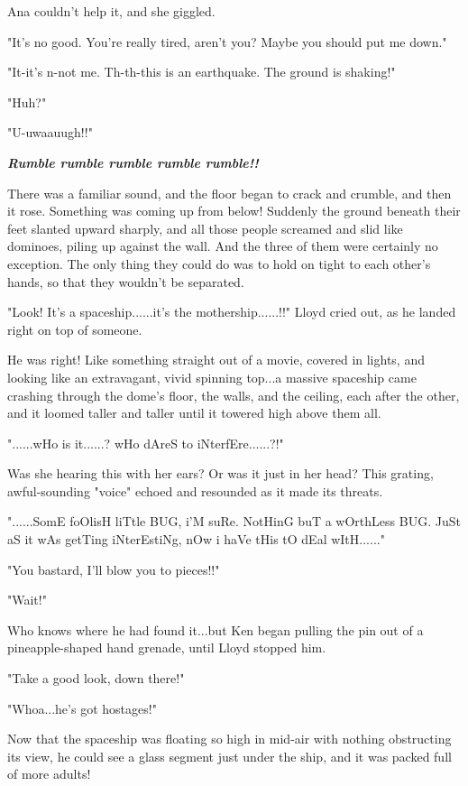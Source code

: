 \documentclass[
]{article}
\begin{document}
Ana couldn't help it, and she giggled.

"It's no good. You're really tired, aren't you? Maybe you should put me
down."

"It-it's n-not me. Th-th-this is an earthquake. The ground is shaking!"

"Huh?"

"U-uwaauugh!!"

\emph{\textbf{Rumble rumble rumble rumble rumble!!}}

There was a familiar sound, and the floor began to crack and crumble,
and then it rose. Something was coming up from below! Suddenly the
ground beneath their feet slanted upward sharply, and all those people
screamed and slid like dominoes, piling up against the wall. And the
three of them were certainly no exception. The only thing they could do
was to hold on tight to each other's hands, so that they wouldn't be
separated.

"Look! It's a spaceship......it's the mothership......!!" Lloyd cried
out, as he landed right on top of someone.

He was right! Like something straight out of a movie, covered in lights,
and looking like an extravagant, vivid spinning top...a massive
spaceship came crashing through the dome's floor, the walls, and the
ceiling, each after the other, and it loomed taller and taller until it
towered high above them all.

"......wHo is it......? wHo dAreS to iNterfEre......?!"

Was she hearing this with her ears? Or was it just in her head? This
grating, awful-sounding "voice" echoed and resounded as it made its
threats.

"......SomE foOlisH liTtle BUG, i'M suRe. NotHinG buT a wOrthLess BUG.
JuSt aS it wAs getTing iNterEstiNg, nOw i haVe tHis tO dEal wItH......"

"You bastard, I'll blow you to pieces!!"

"Wait!"

Who knows where he had found it...but Ken began pulling the pin out of a
pineapple-shaped hand grenade, until Lloyd stopped him.

"Take a good look, down there!"

"Whoa...he's got hostages!"

Now that the spaceship was floating so high in mid-air with nothing
obstructing its view, he could see a glass segment just under the ship,
and it was packed full of more adults!
\end{document}
